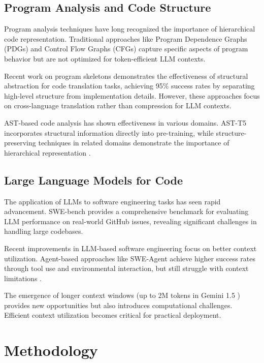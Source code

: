 \documentclass[conference]{IEEEtran}
\begin{document}
\subsection{Program Analysis and Code Structure}

Program analysis techniques have long recognized the importance of hierarchical code representation. Traditional approaches like Program Dependence Graphs (PDGs) and Control Flow Graphs (CFGs) capture specific aspects of program behavior but are not optimized for token-efficient LLM contexts.

Recent work on program skeletons \cite{aleithan2024programskeletons} demonstrates the effectiveness of structural abstraction for code translation tasks, achieving 95\% success rates by separating high-level structure from implementation details. However, these approaches focus on cross-language translation rather than compression for LLM contexts.

AST-based code analysis has shown effectiveness in various domains. AST-T5 \cite{feng2024astt5} incorporates structural information directly into pre-training, while structure-preserving techniques in related domains demonstrate the importance of hierarchical representation \cite{zhang2024structurepreserving}.

\subsection{Large Language Models for Code}

The application of LLMs to software engineering tasks has seen rapid advancement. SWE-bench \cite{jimenez2024swebench} provides a comprehensive benchmark for evaluating LLM performance on real-world GitHub issues, revealing significant challenges in handling large codebases.

Recent improvements in LLM-based software engineering focus on better context utilization. Agent-based approaches like SWE-Agent achieve higher success rates through tool use and environmental interaction, but still struggle with context limitations \cite{yang2024sweagent}.

The emergence of longer context windows (up to 2M tokens in Gemini 1.5 \cite{reid2024gemini}) provides new opportunities but also introduces computational challenges. Efficient context utilization becomes critical for practical deployment.

\section{Methodology}
\end{document}
